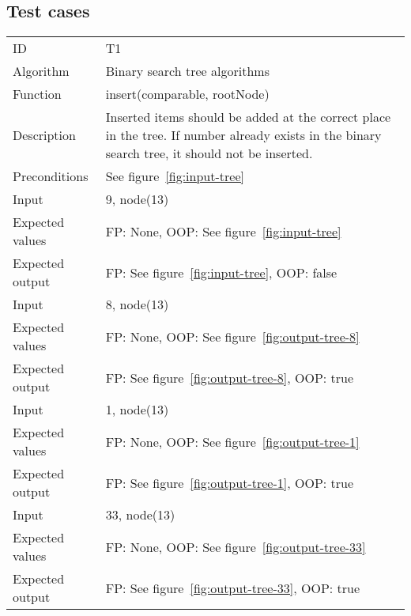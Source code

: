 \documentclass {article}
\begin{document}
\subsection{Test cases}
\begin{tabular}{ | l p{10cm} | }
\hline
ID & T1 \\
Algorithm & Binary search tree algorithms \\
Function & insert(comparable, rootNode) \\
Description & Inserted items should be added at the correct place in the tree. If number already exists in the binary search tree, it should not be inserted. \\
Preconditions & See figure~\ref{fig:input-tree} \\
Input & 9, node(13) \\
Expected values & FP: None, OOP: See figure~\ref{fig:input-tree} \\
Expected output & FP: See figure~\ref{fig:input-tree}, OOP: false \\
Input & 8, node(13) \\
Expected values & FP: None, OOP: See figure~\ref{fig:output-tree-8} \\
Expected output & FP: See figure~\ref{fig:output-tree-8}, OOP: true \\
Input & 1, node(13) \\
Expected values & FP: None, OOP: See figure~\ref{fig:output-tree-1} \\
Expected output & FP: See figure~\ref{fig:output-tree-1}, OOP: true \\
Input & 33, node(13) \\
Expected values & FP: None, OOP: See figure~\ref{fig:output-tree-33} \\
Expected output & FP: See figure~\ref{fig:output-tree-33}, OOP: true \\
\hline
\end{tabular}
\end{document}
